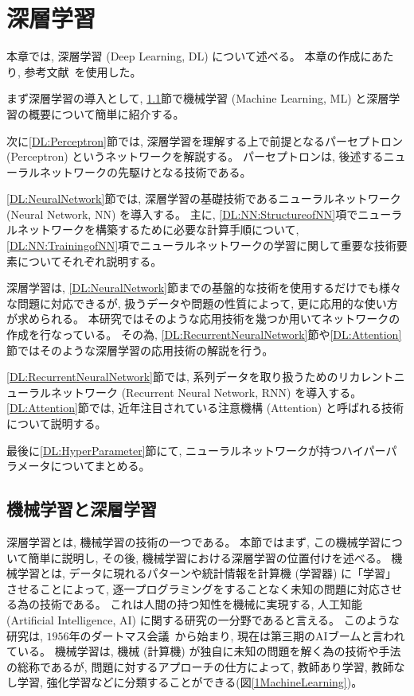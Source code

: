 
\chapter{深層学習} \label{chap:DeepLearning}

本章では, 深層学習 (Deep Learning, DL) について述べる。
本章の作成にあたり, 参考文献~\cite{ZeroDeepLearning1, ZeroDeepLearning2, PythonMLPrograming}を使用した。

まず深層学習の導入として, \ref{DL:MachineandDeepLearning}節で機械学習 (Machine Learning, ML) と深層学習の概要について簡単に紹介する。

次に\ref{DL:Perceptron}節では, 深層学習を理解する上で前提となるパーセプトロン (Perceptron) というネットワークを解説する。
パーセプトロンは, 後述するニューラルネットワークの先駆けとなる技術である。

\ref{DL:NeuralNetwork}節では, 深層学習の基礎技術であるニューラルネットワーク (Neural Network, NN) を導入する。
主に, \ref{DL:NN:StructureofNN}項でニューラルネットワークを構築するために必要な計算手順について, \ref{DL:NN:TrainingofNN}項でニューラルネットワークの学習に関して重要な技術要素についてそれぞれ説明する。

深層学習は, \ref{DL:NeuralNetwork}節までの基盤的な技術を使用するだけでも様々な問題に対応できるが, 扱うデータや問題の性質によって, 更に応用的な使い方が求められる。
本研究ではそのような応用技術を幾つか用いてネットワークの作成を行なっている。
その為, \ref{DL:RecurrentNeuralNetwork}節や\ref{DL:Attention}節ではそのような深層学習の応用技術の解説を行う。

\ref{DL:RecurrentNeuralNetwork}節では, 系列データを取り扱うためのリカレントニューラルネットワーク (Recurrent Neural Network, RNN) を導入する。
\ref{DL:Attention}節では, 近年注目されている注意機構 (Attention) と呼ばれる技術について説明する。

最後に\ref{DL:HyperParameter}節にて, ニューラルネットワークが持つハイパーパラメータについてまとめる。


\section{機械学習と深層学習} \label{DL:MachineandDeepLearning}

深層学習とは, 機械学習の技術の一つである。
本節ではまず, この機械学習について簡単に説明し, その後, 機械学習における深層学習の位置付けを述べる。
\newpage
機械学習とは, データに現れるパターンや統計情報を計算機 (学習器) に「学習」させることによって, 逐一プログラミングをすることなく未知の問題に対応させる為の技術である。
これは人間の持つ知性を機械に実現する, 人工知能 (Artificial Intelligence, AI) に関する研究の一分野であると言える。
このような研究は, $1956$年のダートマス会議~\cite{Dartmouth}から始まり, 現在は第三期のAIブームと言われている。
機械学習は, 機械 (計算機) が独自に未知の問題を解く為の技術や手法の総称であるが, 問題に対するアプローチの仕方によって, 教師あり学習, 教師なし学習, 強化学習などに分類することができる(図\ref{1MachineLearning})。

